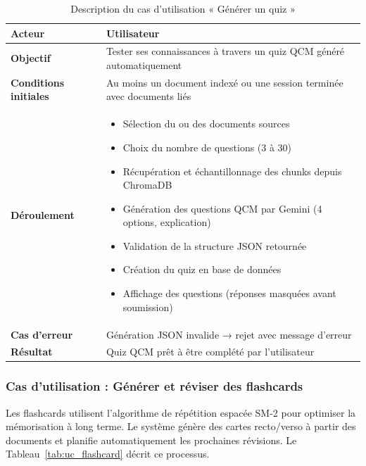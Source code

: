 \begin{table}[H]
\centering
\renewcommand{\arraystretch}{1.2}
\begin{tabular}{|p{4cm}|p{10cm}|}
\hline
\textbf{Acteur} & Utilisateur \\ \hline

\textbf{Objectif} & Tester ses connaissances à travers un quiz QCM généré automatiquement \\ \hline

\textbf{Conditions initiales} & Au moins un document indexé ou une session terminée avec documents liés \\ \hline

\textbf{Déroulement} &
\begin{itemize}
    \item Sélection du ou des documents sources
    \item Choix du nombre de questions (3 à 30)
    \item Récupération et échantillonnage des chunks depuis ChromaDB
    \item Génération des questions QCM par Gemini (4 options, explication)
    \item Validation de la structure JSON retournée
    \item Création du quiz en base de données
    \item Affichage des questions (réponses masquées avant soumission)
\end{itemize} \\ \hline

\textbf{Cas d'erreur} & Génération JSON invalide → rejet avec message d'erreur \\ \hline

\textbf{Résultat} & Quiz QCM prêt à être complété par l'utilisateur \\ \hline
\end{tabular}
\caption{Description du cas d'utilisation « Générer un quiz »}
\label{tab:uc_quiz}
\end{table}

\subsubsection{Cas d'utilisation : Générer et réviser des flashcards}

Les flashcards utilisent l'algorithme de répétition espacée SM-2 pour optimiser la mémorisation à long terme. Le système génère des cartes recto/verso à partir des documents et planifie automatiquement les prochaines révisions. Le Tableau~\ref{tab:uc_flashcard} décrit ce processus.

